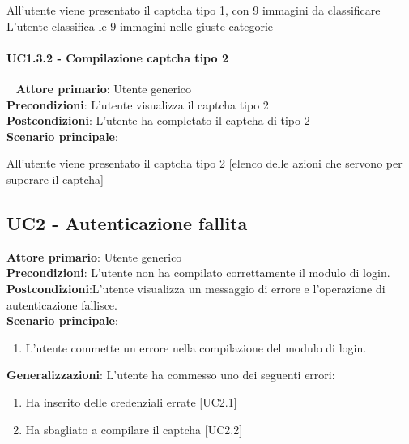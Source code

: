 All'utente viene presentato il captcha tipo 1, con 9 immagini da classificare\\
L'utente classifica le 9 immagini nelle giuste categorie


\paragraph{UC1.3.2 - Compilazione captcha tipo 2}~\smallskip
\textbf{Attore primario}: Utente generico\\
\textbf{Precondizioni}: L'utente visualizza il captcha tipo 2\\
\textbf{Postcondizioni}: L'utente ha completato il captcha di tipo 2\\
\textbf{Scenario principale}:

All'utente viene presentato il captcha tipo 2
[elenco delle azioni che servono per superare il captcha]

\subsection{UC2 - Autenticazione fallita}
\textbf{Attore primario}: Utente generico\\
\textbf{Precondizioni}: L’utente non ha compilato correttamente il modulo di login.\\
\textbf{Postcondizioni}:L’utente visualizza un messaggio di errore e l’operazione di autenticazione fallisce.\\

\textbf{Scenario principale}:
\begin{enumerate}
   \item L’utente commette un errore nella compilazione del modulo di login.
\end{enumerate}

\textbf{Generalizzazioni}: L'utente ha commesso uno dei seguenti errori:
\begin{enumerate}
	\item Ha inserito delle credenziali errate [UC2.1]
	\item Ha sbagliato a compilare il captcha [UC2.2]
\end{enumerate}

